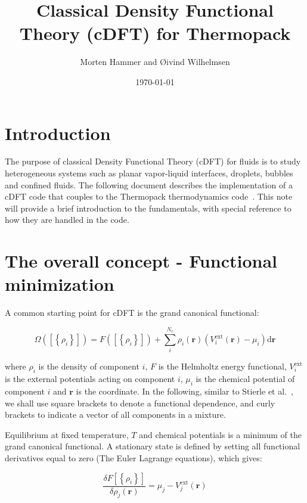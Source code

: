 \documentclass[12pt, letterpaper]{article}
\title{Classical Density Functional Theory (cDFT) for Thermopack}
\author{Morten Hammer and Øivind Wilhelmsen}
\date{\today}
\begin{document}


\begin{titlepage}
\maketitle
\end{titlepage}

\section{Introduction}
The purpose of classical Density Functional Theory (cDFT) for fluids is to study heterogeneous systems such as planar vapor-liquid interfaces, droplets, bubbles and confined fluids. The following document describes the implementation of a cDFT code that couples to the Thermopack thermodynamics code~\cite{Wilhelmsen2017,ThermopackGithub}. This note will provide a brief introduction to the fundamentals, with special reference to how they are handled in the code.

\section{The overall concept - Functional minimization}
A common starting point for cDFT is the grand canonical functional:

\begin{equation}
  \Omega\left(\left[\left\{\rho_i\right\}\right]\right)=F\left(\left[\left\{\rho_i\right\}\right]\right)+\sum_i^{N_c}\rho_i\left(\mathbf{r}\right)\left(V_i^{\text{ext}}\left(\mathbf{r}\right)-\mu_i\right)\text{d}\mathbf{r}
  \label{eq:Omega}
\end{equation}

where $\rho_i$ is the density of component $i$, $F$ is the Helmholtz energy functional, $V_i^{\text{ext}}$ is the external potentials acting on component $i$, $\mu_i$ is the chemical potential of component $i$ and $\mathbf{r}$ is the coordinate. In the following, similar to Stierle et al.~\cite{stierle2020a}, we shall use square brackets to denote a functional dependence, and curly brackets to indicate a vector of all components in a mixture. 

Equilibrium at fixed temperature, $T$ and chemical potentials is a minimum of the grand canonical functional. A stationary state is defined by setting all functional derivatives equal to zero (The Euler Lagrange equations), which gives:

\begin{equation}
  \frac{\delta F\left[\left\{\rho_i\right\}\right]}{\delta \rho_j\left(\mathbf{r}\right)}=\mu_j-V_j^{\text{ext}}\left(\mathbf{r}\right)
  \label{eq:fd}
\end{equation}
\end{document}
